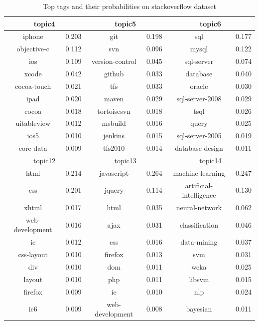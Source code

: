\begin{table}[htp]
\caption{Top tags and their probabilities on stackoverflow dataset}
\label{tab:stacktags}
\centering
\begin{tabular}{|c|c|c|c|c|c|}
\hline
\multicolumn{2}{|c|}{topic4} & \multicolumn{2}{c|}{topic5} & \multicolumn{2}{c|}{topic6}  \\
\hline
iphone&0.203&git&0.198&sql&0.177\\
\hline
objective-c&0.112&svn&0.096&mysql&0.122\\
\hline
ios&0.109&version-control&0.045&sql-server&0.074\\
\hline
xcode&0.042&github&0.033&database&0.040\\
\hline
cocoa-touch&0.021&tfs&0.033&oracle&0.030\\
\hline
ipad&0.020&maven&0.029&sql-server-2008&0.029\\
\hline
cocoa&0.018&tortoisesvn&0.018&tsql&0.026\\
\hline
uitableview&0.012&msbuild&0.016&query&0.025\\
\hline
ios5&0.010&jenkins&0.015&sql-server-2005&0.019\\
\hline
core-data&0.009&tfs2010&0.014&database-design&0.011\\
\hline
\hline
\multicolumn{2}{|c|}{topic12} & \multicolumn{2}{c|}{topic13} & \multicolumn{2}{c|}{topic14}   \\
\hline
html&0.214&javascript&0.264&machine-learning&0.247\\
\hline
css&0.201&jquery&0.114&artificial-intelligence&0.130\\
\hline
xhtml&0.017&html&0.035&neural-network&0.062\\
\hline
web-development&0.016&ajax&0.031&classification&0.046\\
\hline
ie&0.012&css&0.016&data-mining&0.037\\
\hline
css-layout&0.010&firefox&0.013&svm&0.031\\
\hline
div&0.010&dom&0.011&weka&0.025\\
\hline
layout&0.010&php&0.011&libsvm&0.015\\
\hline
firefox&0.009&ie&0.010&nlp&0.024\\
\hline
ie6&0.009&web-development&0.008&bayesian&0.011\\
\hline
\end{tabular}
\end{table}

